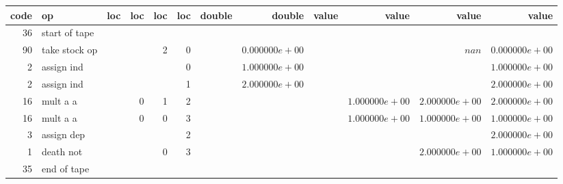 \documentclass{article}
\begin{document}
\tiny
\begin{tabular}{|r|l|r|r|r|r||r|r||r|r|r|r|} \hline 
 code & op & loc & loc & loc & loc & double & double & value & value & value & value \\ \hline 
 36 & start of tape & & & & & & & & & &  \\ \hline 
90 & take stock op & & & 2 & 0 & &$ 0.000000e+00 $& & &$ nan $&$ 0.000000e+00 $\\ \hline 
2 & assign ind & & & & 0 & &$ 1.000000e+00 $& & & &$ 1.000000e+00 $\\ \hline 
2 & assign ind & & & & 1 & &$ 2.000000e+00 $& & & &$ 2.000000e+00 $\\ \hline 
16 & mult a a & & 0 & 1 & 2 & & & &$ 1.000000e+00 $&$ 2.000000e+00 $&$ 2.000000e+00 $\\ \hline 
16 & mult a a & & 0 & 0 & 3 & & & &$ 1.000000e+00 $&$ 1.000000e+00 $&$ 1.000000e+00 $\\ \hline 
3 & assign dep & & & & 2 & & & & & &$ 2.000000e+00 $\\ \hline 
1 & death not & & & 0 & 3 & & & & &$ 2.000000e+00 $&$ 1.000000e+00 $\\ \hline 
 35 & end of tape & & & & & & & & & &  \\ \hline 
\end{tabular}
\end{document}
